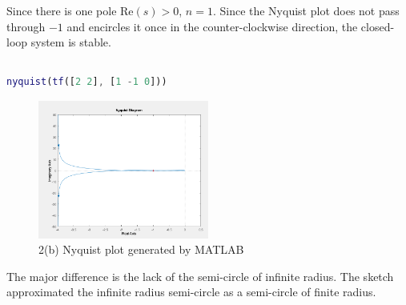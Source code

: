 Since there is one pole Re$(s) > 0$, $n = 1$. Since the Nyquist plot does not pass through $-1$ and encircles it once in the counter-clockwise direction,
the closed-loop system is stable.

\subsection{}
\begin{lstlisting}[language=Matlab]
nyquist(tf([2 2], [1 -1 0]))
\end{lstlisting}
\begin{figure}[h]
    \centering
    \includegraphics[width=0.5\textwidth]{Questions/Figures/Q2Matlab.png}
    \caption{2(b) Nyquist plot generated by MATLAB}
\end{figure}

The major difference is the lack of the semi-circle of infinite radius. The sketch approximated the infinite radius semi-circle as a
semi-circle of finite radius.

